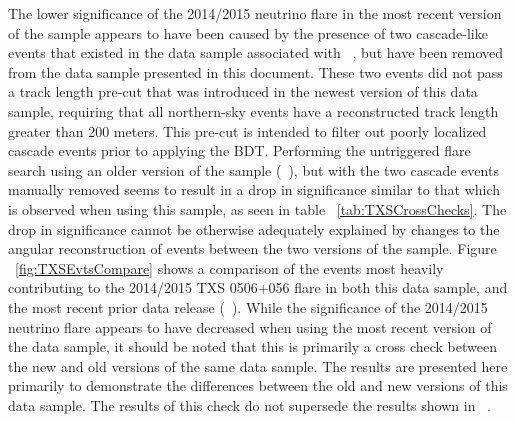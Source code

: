 \documentclass[aps,10pt,prd,twocolumn,floats,letterpaper,showpacs,nofootinbib,bibnotes,notitlepage,superscriptaddress,floatfix]{revtex4-1}
\begin{document}
The lower significance of the 2014/2015 neutrino flare in the most recent version of the sample appears to have been caused by the presence of two cascade-like events that existed in the data sample associated with ~\cite{IceCube:2019}, but have been removed from the data sample presented in this document. These two events did not pass a track length pre-cut that was introduced in the newest version of this data sample, requiring that all northern-sky events have a reconstructed track length greater than 200 meters. This pre-cut is intended to filter out poorly localized cascade events prior to applying the BDT. Performing the untriggered flare search using an older version of the sample (~\cite{IceCube:2019}), but with the two cascade events manually removed seems to result in a drop in significance similar to that which is observed when using this sample, as seen in table ~\ref{tab:TXSCrossChecks}. The drop in significance cannot be otherwise adequately explained by changes to the angular reconstruction of events between the two versions of the sample. Figure ~\ref{fig:TXSEvtsCompare} shows a comparison of the events most heavily contributing to the 2014/2015 TXS 0506+056 flare in both this data sample, and the most recent prior data release (~\cite{IceCube:2019}). While the significance of the 2014/2015 neutrino flare appears to have decreased when using the most recent version of the data sample, it should be noted that this is primarily a cross check between the new and old versions of the same data sample. The results are presented here primarily to demonstrate the differences between the old and new versions of this data sample. The results of this check do not supersede the results shown in ~\cite{IceCube:2018cha}.
\end{document}
